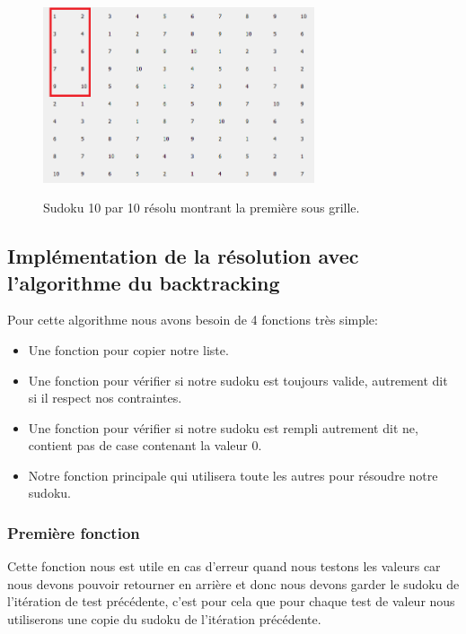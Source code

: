 \begin{figure}[h]
  \begin{center}
\includegraphics[width=8cm]{./images/10_10.png}\label{10_10}
\caption{Sudoku 10 par 10 résolu montrant la première sous grille.}
\end{center}
\end{figure}

\subsection{Implémentation de la résolution avec l'algorithme du backtracking}

Pour cette algorithme nous avons besoin de 4 fonctions très simple:

\begin{itemize}
  \item Une fonction pour copier notre liste.
  \item Une fonction pour vérifier si notre sudoku est toujours valide, autrement dit si il respect nos contraintes.
  \item Une fonction pour vérifier si notre sudoku est rempli autrement dit ne, contient pas de case contenant la valeur 0.
  \item Notre fonction principale qui utilisera toute les autres pour résoudre notre sudoku.
\end{itemize}

\subsubsection{Première fonction}

Cette fonction nous est utile en cas d'erreur quand nous testons les valeurs car nous devons pouvoir retourner en arrière et donc nous devons garder le sudoku de l'itération de test précédente, c'est pour cela que pour chaque test de valeur nous utiliserons une copie du sudoku de l'itération précédente.\newline

